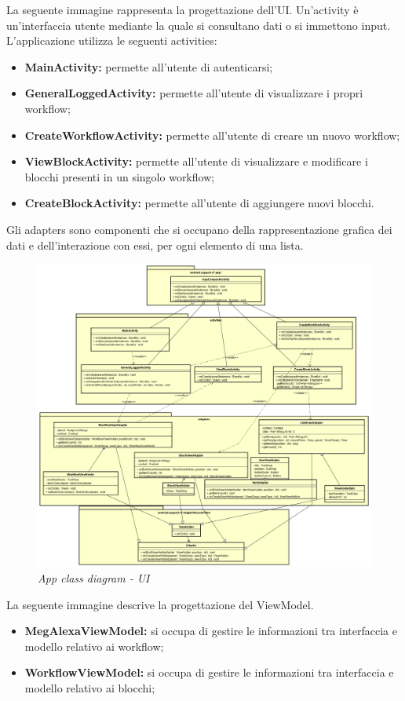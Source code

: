 \newpage
La seguente immagine rappresenta la progettazione dell'UI.
Un'activity è un’interfaccia utente mediante la quale si consultano dati o si immettono input.
L'applicazione utilizza le seguenti activities:
\begin{itemize}
	\item \textbf{MainActivity:} permette all'utente di autenticarsi;  
	\item \textbf{GeneralLoggedActivity: } permette all'utente di visualizzare i propri workflow; 
	\item \textbf{CreateWorkflowActivity: } permette all'utente di creare un nuovo workflow; 
	\item \textbf{ViewBlockActivity: } permette all'utente di visualizzare e modificare i blocchi presenti in un singolo workflow;
	\item \textbf{CreateBlockActivity: } permette all'utente di aggiungere nuovi blocchi.

\end{itemize}
Gli adapters sono componenti che si occupano della rappresentazione grafica dei dati e dell'interazione con essi, per ogni elemento di una lista.
\clearpage
\begin{figure} [H]
	\centering
	\includegraphics[scale=0.3]{./images/UI.png}
	\caption{\textit{App class diagram - UI}}\label{UI}
\end{figure}
\newpage
La seguente immagine descrive la progettazione del ViewModel.
\begin{itemize}
	\item \textbf{MegAlexaViewModel:} si occupa di gestire le informazioni tra interfaccia e modello relativo ai workflow;  
	\item \textbf{WorkflowViewModel: } si occupa di gestire le informazioni tra interfaccia e modello relativo ai blocchi;
\end{itemize}
